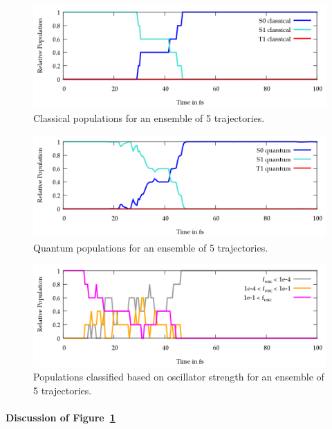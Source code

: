 \documentclass[a4paper,11pt,DIV=15,openany]{scrbook}
\begin{document}
\begin{figure}[ptb]
  \centering
  \includegraphics[width=\textwidth]{figures/pop_class.png}
  \caption{Classical populations for an ensemble of 5 trajectories.}
  \label{fig:pop_class}
\end{figure}
\begin{figure}[ptb]
  \centering
  \includegraphics[width=\textwidth]{figures/pop_quant.png}
  \caption{Quantum populations for an ensemble of 5 trajectories.}
  \label{fig:pop_quant}
\end{figure}
\begin{figure}[ptb]
  \centering
  \includegraphics[width=\textwidth]{figures/pop_fosc.png}
  \caption{Populations classified based on oscillator strength for an ensemble of 5 trajectories.}
  \label{fig:pop_fosc}
\end{figure}



\paragraph{Discussion of Figure~\ref{fig:pop_class}}
\end{document}
